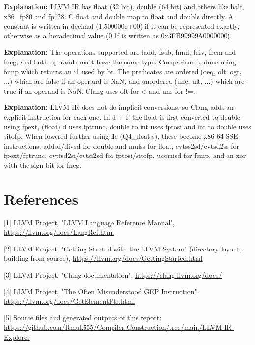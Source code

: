 \textbf{Explanation: }LLVM IR has float (32 bit), double (64 bit) and others like half, x86\_fp80 and fp128. C float and double map to float and double directly. A constant is written in decimal (1.500000e+00) if it can be represented exactly, otherwise as a hexadecimal value (0.1f is written as 0x3FB99999A0000000).


\textbf{Explanation: }The operations supported are fadd, fsub, fmul, fdiv, frem and fneg, and both operands must have the same type. Comparison is done using fcmp which returns an i1 used by br. The predicates are ordered (oeq, olt, ogt, ...) which are false if an operand is NaN, and unordered (une, ult, ...) which are true if an operand is NaN. Clang uses olt for \textless{} and une for !=.


\textbf{Explanation: }LLVM IR does not do implicit conversions, so Clang adds an explicit instruction for each one. In d + f, the float is first converted to double using fpext, (float) d uses fptrunc, double to int uses fptosi and int to double uses sitofp. When lowered further using llc (Q4\_float.s), these become x86-64 SSE instructions: addsd/divsd for double and mulss for float, cvtss2sd/cvtsd2ss for fpext/fptrunc, cvttsd2si/cvtsi2sd for fptosi/sitofp, ucomisd for fcmp, and an xor with the sign bit for fneg.


\section*{References}

[1] LLVM Project, "LLVM Language Reference Manual", \url{https://llvm.org/docs/LangRef.html}


[2] LLVM Project, "Getting Started with the LLVM System" (directory layout, building from source), \url{https://llvm.org/docs/GettingStarted.html}


[3] LLVM Project, "Clang documentation", \url{https://clang.llvm.org/docs/}


[4] LLVM Project, "The Often Misunderstood GEP Instruction", \url{https://llvm.org/docs/GetElementPtr.html}


[5] Source files and generated outputs of this report: \url{https://github.com/Rmuk655/Compiler-Construction/tree/main/LLVM-IR-Explorer}

